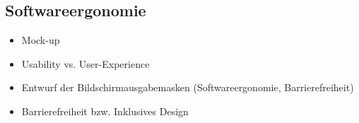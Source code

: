 \subsection{Softwareergonomie}
\label{sec:Softwareergonomie}

\begin{itemize}
	\item Mock-up
	\item Usability vs. User-Experience
	\item Entwurf der Bildschirmausgabemasken (Softwareergonomie, Barrierefreiheit)
	\item Barrierefreiheit bzw. Inklusives Design
\end{itemize}